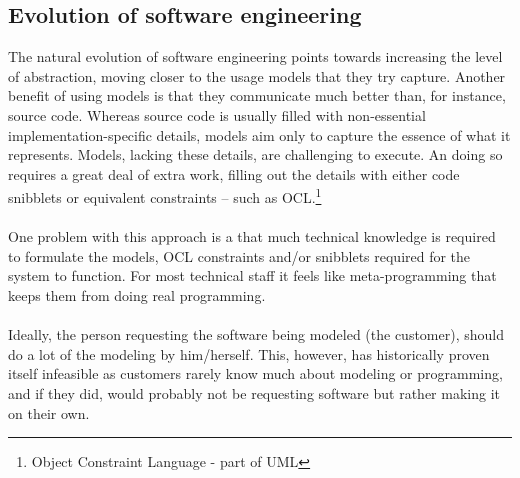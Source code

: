 \documentclass[10pt]{scrreprt}
\begin{document}
\subsection{Evolution of software engineering}
The natural evolution of software engineering points towards increasing the level of abstraction, moving closer to the usage models that they try capture. Another benefit of using models is that they communicate much better than, for instance, source code. Whereas source code is usually filled with non-essential implementation-specific details, models aim only to capture the essence of what it represents. Models, lacking these details, are challenging to execute. An doing so requires a great deal of extra work, filling out the details with either code snibblets or equivalent constraints -- such as OCL.\footnote{Object Constraint Language - part of UML}\\\\
One problem with this approach is a that much technical knowledge is required to formulate the models, OCL constraints and/or snibblets required for the system to function. For most technical staff it feels like meta-programming that keeps them from doing real programming.
\\\\
Ideally, the person requesting the software being modeled (the customer), should do a lot of the modeling by him/herself. This, however, has historically proven itself infeasible as customers rarely know much about modeling or programming, and if they did, would probably not be requesting software but rather making it on their own.

\end{document}
